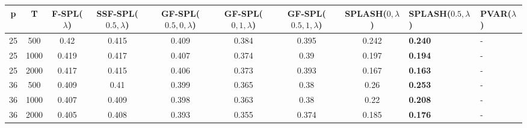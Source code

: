 \begin{tabular}{ccccccccll}
\hline
  p  &  T   &  F-SPL($\lambda$)  &  SSF-SPL($0.5, \lambda$)  &  GF-SPL($0.5, 0, \lambda$)  &  GF-SPL($0, 1, \lambda$)  &  GF-SPL($0.5, 1, \lambda$)  &  SPLASH($0, \lambda$)  & SPLASH($0.5, \lambda$)   & PVAR($\lambda$)   \\
\hline
 25  & 500  &        0.42        &           0.415           &            0.409            &           0.384           &            0.395            &         0.242          & \textbf{0.240}           & -                 \\
 25  & 1000 &       0.419        &           0.417           &            0.407            &           0.374           &            0.39             &         0.197          & \textbf{0.194}           & -                 \\
 25  & 2000 &       0.417        &           0.415           &            0.406            &           0.373           &            0.393            &         0.167          & \textbf{0.163}           & -                 \\
 36  & 500  &       0.409        &           0.41            &            0.399            &           0.365           &            0.38             &          0.26          & \textbf{0.253}           & -                 \\
 36  & 1000 &       0.407        &           0.409           &            0.398            &           0.363           &            0.38             &          0.22          & \textbf{0.208}           & -                 \\
 36  & 2000 &       0.405        &           0.408           &            0.393            &           0.355           &            0.374            &         0.185          & \textbf{0.176}           & -                 \\
\hline
\end{tabular}